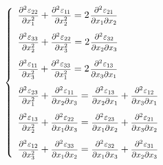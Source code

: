 \begin{equation*}
\left\{
\begin{array}{l}
\scalebox{.83}{$ \displaystyle \frac{\partial^2 \infinitesimaldeformationcomponents{22}}{\partial x_1^2} $}
+ \scalebox{.83}{$ \displaystyle \frac{\partial^2 \infinitesimaldeformationcomponents{1\hspace{-0.1ex}1}}{\partial x_2^2} $}
= 2 \hspace{.2ex}
\scalebox{.83}{$ \displaystyle \frac{\partial^2 \infinitesimaldeformationcomponents{21}}{\partial x_{1} \partial x_{2}} $}
\\[1.2em]
%
\scalebox{.83}{$ \displaystyle \frac{\partial^2 \infinitesimaldeformationcomponents{33}}{\partial x_2^2} $}
+ \scalebox{.83}{$ \displaystyle \frac{\partial^2 \infinitesimaldeformationcomponents{22}}{\partial x_3^2} $}
= 2 \hspace{.2ex}
\scalebox{.83}{$ \displaystyle \frac{\partial^2 \infinitesimaldeformationcomponents{32}}{\partial x_{2} \partial x_{3}} $}
\\[1.2em]
%
\scalebox{.83}{$ \displaystyle \frac{\partial^2 \infinitesimaldeformationcomponents{1\hspace{-0.1ex}1}}{\partial x_3^2} $}
+ \scalebox{.83}{$ \displaystyle \frac{\partial^2 \infinitesimaldeformationcomponents{33}}{\partial x_1^2} $}
= 2 \hspace{.2ex}
\scalebox{.83}{$ \displaystyle \frac{\partial^2 \infinitesimaldeformationcomponents{13}}{\partial x_{3} \partial x_{1}} $}
\\[1.2em]
%
\scalebox{.83}{$ \displaystyle \frac{\partial^2 \infinitesimaldeformationcomponents{23}}{\partial x_1^2} $}
+ \scalebox{.83}{$ \displaystyle \frac{\partial^2 \infinitesimaldeformationcomponents{11}}{\partial x_{2} \partial x_{3}} $}
=
\scalebox{.83}{$ \displaystyle \frac{\partial^2 \infinitesimaldeformationcomponents{13}}{\partial x_{2} \partial x_{1}} $}
+ \scalebox{.83}{$ \displaystyle \frac{\partial^2 \infinitesimaldeformationcomponents{12}}{\partial x_{3} \partial x_{1}} $}
\\[1.2em]
%
\scalebox{.83}{$ \displaystyle \frac{\partial^2 \infinitesimaldeformationcomponents{13}}{\partial x_2^2} $}
+ \scalebox{.83}{$ \displaystyle \frac{\partial^2 \infinitesimaldeformationcomponents{22}}{\partial x_{1} \partial x_{3}} $}
=
\scalebox{.83}{$ \displaystyle \frac{\partial^2 \infinitesimaldeformationcomponents{23}}{\partial x_{1} \partial x_{2}} $}
+ \scalebox{.83}{$ \displaystyle \frac{\partial^2 \infinitesimaldeformationcomponents{21}}{\partial x_{3} \partial x_{2}} $}
\\[1.2em]
%
\scalebox{.83}{$ \displaystyle \frac{\partial^2 \infinitesimaldeformationcomponents{12}}{\partial x_3^2} $}
+ \scalebox{.83}{$ \displaystyle \frac{\partial^2 \infinitesimaldeformationcomponents{33}}{\partial x_{1} \partial x_{2}} $}
=
\scalebox{.83}{$ \displaystyle \frac{\partial^2 \infinitesimaldeformationcomponents{32}}{\partial x_{1} \partial x_{3}} $}
+ \scalebox{.83}{$ \displaystyle \frac{\partial^2 \infinitesimaldeformationcomponents{31}}{\partial x_{2} \partial x_{3}} $}
\end{array}
\right.
\end{equation*}

